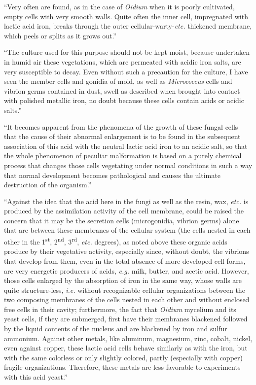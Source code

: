 \documentclass[a4paper, 12pt, oneside]{article}
\begin{document}
``Very often are found, as in the case of \emph{Oidium} when it is poorly cultivated, empty cells with very smooth walls. Quite often the inner cell, impregnated with lactic acid iron, breaks through the outer cellular-warty-\emph{etc.} thickened membrane, which peels or splits as it grows out.''

``The culture used for this purpose should not be kept moist, because undertaken in humid air these vegetations, which are permeated with acidic iron salts, are very susceptible to decay. Even without such a precaution for the culture, I have seen the member cells and gonidia of mold, as well as \emph{Micrococcus} cells and vibrion germs contained in dust, swell as described when brought into contact with polished metallic iron, no doubt because these cells contain acids or acidic salts.''

``It becomes apparent from the phenomena of the growth of these fungal cells that the cause of their abnormal enlargement is to be found in the subsequent association of this acid with the neutral lactic acid iron to an acidic salt, so that the whole phenomenon of peculiar malformation is based on a purely chemical process that changes those cells vegetating under normal conditions in such a way that normal development becomes pathological and causes the ultimate destruction of the organism.''

``Against the idea that the acid here in the fungi as well as the resin, wax, \emph{etc.} is produced by the assimilation activity of the cell membrane, could be raised the concern that it may be the secretion cells (microgonidia, vibrion germs) alone that are between these membranes of the cellular system (the cells nested in each other in the 1\textsuperscript{st}, 2\textsuperscript{nd}, 3\textsuperscript{rd}, \emph{etc.} degrees), as noted above these organic acids produce by their vegetative activity, especially since, without doubt, the vibrions that develop from them, even in the total absence of more developed cell forms, are very energetic producers of acids, \emph{e.g.} milk, butter, and acetic acid. However, those cells enlarged by the absorption of iron in the same way, whose walls are quite structure-less, \emph{i.e.} without recognizable cellular organizations between the two composing membranes of the cells nested in each other and without enclosed free cells in their cavity; furthermore, the fact that \emph{Oidium} mycelium and its yeast cells, if they are submerged, first have their membranes blackened followed by the liquid contents of the nucleus and are blackened by iron and sulfur ammonium. Against other metals, like aluminum, magnesium, zinc, cobalt, nickel, even against copper, these lactic acid cells behave similarly as with the iron, but with the same colorless or only slightly colored, partly (especially with copper) fragile organizations. Therefore, these metals are less favorable to experiments with this acid yeast.''
\end{document}
